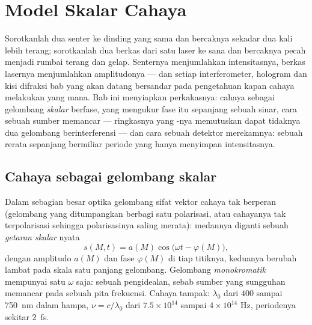 \chapter{Model Skalar Cahaya}\label{ch:b2:scalar-light-model}

Sorotkanlah dua senter ke dinding yang sama dan bercaknya sekadar dua kali
lebih terang; sorotkanlah dua berkas dari satu laser ke sana dan bercaknya pecah menjadi
rumbai terang dan gelap. Senternya menjumlahkan intensitasnya, berkas lasernya
menjumlahkan amplitudonya --- dan setiap interferometer, hologram dan
kisi difraksi bab yang akan datang bersandar pada pengetahuan kapan cahaya
melakukan yang mana. Bab ini menyiapkan perkakasnya: cahaya sebagai gelombang
\emph{skalar} berfase, \emph{} yang mengukur fase itu
sepanjang sebuah sinar, cara sebuah sumber memancar --- ringkasnya  yang
\emph{}-nya memutuskan dapat tidaknya dua gelombang berinterferensi --- dan
cara sebuah detektor merekamnya: sebuah rerata sepanjang bermiliar periode
yang hanya menyimpan intensitasnya.

\section{Cahaya sebagai gelombang skalar}

\begin{definition}\label{def:b2:scalar-light-model:scalar}
Dalam sebagian besar optika gelombang sifat vektor cahaya tak berperan (gelombang
yang ditumpangkan berbagi satu polarisasi, atau cahayanya tak terpolarisasi
sehingga polarisasinya saling merata): medannya diganti sebuah
\emph{getaran skalar} nyata
\[
s(M, t) = a(M)\cos\bigl(\omega t - \varphi(M)\bigr) ,
\]
dengan amplitudo $a(M)$ dan fase $\varphi(M)$ di tiap titiknya, keduanya
berubah lambat pada skala satu panjang gelombang. Gelombang \emph{monokromatik}
mempunyai satu $\omega$ saja: sebuah pengidealan, sebab sumber yang sungguhan memancar
pada sebuah pita frekuensi. Cahaya tampak: $\lambda_0$ dari $400$ sampai
\qty{750}{nm} dalam hampa, $\nu = c/\lambda_0$ dari $7.5 \times 10^{14}$ sampai $4 \times 10^{14}$ Hz,
periodenya sekitar \qty{2}{fs}.
\end{definition}

